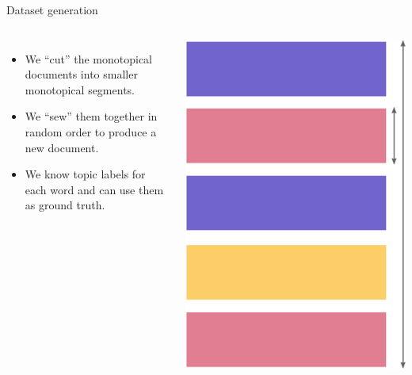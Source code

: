 \documentclass[russian]{beamer}
\begin{document}
\begin{frame}{Dataset generation}
  \begin{columns}
    \begin{itemize}\setlength{\itemindent}{-1em} %
      \item We “cut” the monotopical documents into smaller monotopical segments.
      \item We “sew” them together in random order to produce a new document. 
      \item We know topic labels for each word and can use them as ground truth.
    \end{itemize}
    
  
    \includegraphics[width=0.95\linewidth, height=0.6\textheight]{dataset} %
  \end{columns}
  
  \medskip
  

\end{frame}
\end{document}

